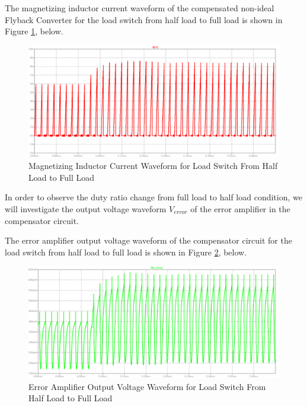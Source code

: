 The magnetizing inductor current waveform of the compensated non-ideal Flyback Converter for the load switch from half load to full load is shown in Figure \ref{com:ILm_HF}, below.

\begin{figure}[H]
\begin{center}
\includegraphics[width=1\textwidth]{comp_simulations/ILm_HF.png}
\caption{Magnetizing Inductor Current Waveform for Load Switch From Half Load to Full Load}
\label{com:ILm_HF}
\end{center}
\end{figure}

In order to observe the duty ratio change from full load to half load condition, we will investigate the output voltage waveform $V_{error}$ of the error amplifier in the compensator circuit.

The error amplifier output voltage waveform of the compensator circuit for the load switch from half load to full load is shown in Figure \ref{com:Verror_HF}, below.

\begin{figure}[H]
\begin{center}
\includegraphics[width=1\textwidth]{comp_simulations/Verror_HF.png}
\caption{Error Amplifier Output Voltage Waveform for Load Switch From Half Load to Full Load}
\label{com:Verror_HF}
\end{center}
\end{figure}

